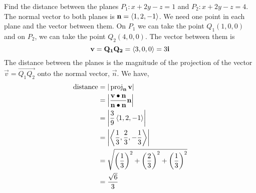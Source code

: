 \documentclass[handout]{ximera}
\begin{document}
\begin{example}
Find the distance between the planes $P_1: x +2y - z = 1$ and $P_2: x+2y-z = 4$.\\
The normal vector to both planes is $\mathbf{n} = \left\langle 1, 2, -1\right\rangle$. We need one point in each plane and the vector between them.
On $P_1$ we can take the point $Q_1(1, 0, 0)$ and on $P_2$, we can take the point $Q_2(4, 0, 0)$. The vector between them is 
\[
\mathbf{v} = \mathbf{Q_1Q_2} = \left\langle 3,0,0\right\rangle = 3\mathbf{i}
\]
The distance between the planes is the magnitude of the projection of the vector $\vec{v} = \vec{Q_1Q_2}$ onto the normal vector, $\vec{n}$. We have,
\begin{align*}
\text{distance} &= | \operatorname{proj}_{\mathbf{n}}\mathbf{v}| \\
               &= \left| \frac{\mathbf{v}\bullet \mathbf{n}}{\mathbf{n}\bullet \mathbf{n}} \mathbf{n}\right|\\
               &= \left|\frac{3}{9} \left\langle 1, 2, -1\right\rangle\right|\\
               &= \left| \left\langle \frac13, \frac23, -\frac13\right\rangle\right|\\
               &= \sqrt{\left( \frac13\right)^2 + \left( \frac23\right)^2 + \left( \frac13\right)^2}\\
               & = \frac{\sqrt{6}}{3}
\end{align*}
\end{example}

\begin{image}
\end{image}
\end{document}
